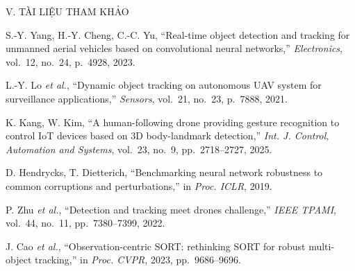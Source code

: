 \documentclass[12pt]{extarticle}
\begin{document}
\begin{muc}{V. TÀI LIỆU THAM KHẢO}
{\fontsize{20}{25}\selectfont
[1] S.-Y. Yang, H.-Y. Cheng, C.-C. Yu, ``Real-time object detection and tracking for unmanned aerial vehicles based on convolutional neural networks,'' \textit{Electronics}, vol.~12, no.~24, p.~4928, 2023.\par
[2] L.-Y. Lo \textit{et al.}, ``Dynamic object tracking on autonomous UAV system for surveillance applications,'' \textit{Sensors}, vol.~21, no.~23, p.~7888, 2021.\par
[3] K. Kang, W. Kim, ``A human-following drone providing gesture recognition to control IoT devices based on 3D body-landmark detection,'' \textit{Int. J. Control, Automation and Systems}, vol.~23, no.~9, pp.~2718--2727, 2025.\par
[4] D. Hendrycks, T. Dietterich, ``Benchmarking neural network robustness to common corruptions and perturbations,'' in \textit{Proc. ICLR}, 2019.\par
[5] P. Zhu \textit{et al.}, ``Detection and tracking meet drones challenge,'' \textit{IEEE TPAMI}, vol.~44, no.~11, pp.~7380--7399, 2022.\par
[6] J. Cao \textit{et al.}, ``Observation-centric SORT: rethinking SORT for robust multi-object tracking,'' in \textit{Proc. CVPR}, 2023, pp.~9686--9696.\par}
\end{muc}
\end{document}

